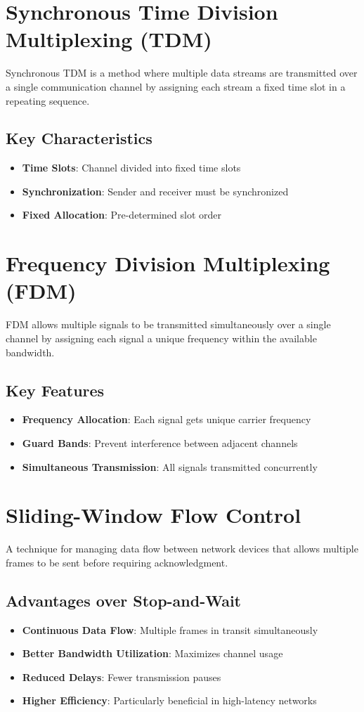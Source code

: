 \documentclass[12pt,a4paper]{article}
\begin{document}
\section{Synchronous Time Division Multiplexing (TDM)}
Synchronous TDM is a method where multiple data streams are transmitted over a single communication channel by assigning each stream a fixed time slot in a repeating sequence.

\subsection{Key Characteristics}
\begin{itemize}
    \item \textbf{Time Slots}: Channel divided into fixed time slots
    \item \textbf{Synchronization}: Sender and receiver must be synchronized
    \item \textbf{Fixed Allocation}: Pre-determined slot order
\end{itemize}

\section{Frequency Division Multiplexing (FDM)}
FDM allows multiple signals to be transmitted simultaneously over a single channel by assigning each signal a unique frequency within the available bandwidth.

\subsection{Key Features}
\begin{itemize}
    \item \textbf{Frequency Allocation}: Each signal gets unique carrier frequency
    \item \textbf{Guard Bands}: Prevent interference between adjacent channels
    \item \textbf{Simultaneous Transmission}: All signals transmitted concurrently
\end{itemize}

\section{Sliding-Window Flow Control}
A technique for managing data flow between network devices that allows multiple frames to be sent before requiring acknowledgment.

\subsection{Advantages over Stop-and-Wait}
\begin{itemize}
    \item \textbf{Continuous Data Flow}: Multiple frames in transit simultaneously
    \item \textbf{Better Bandwidth Utilization}: Maximizes channel usage
    \item \textbf{Reduced Delays}: Fewer transmission pauses
    \item \textbf{Higher Efficiency}: Particularly beneficial in high-latency networks
\end{itemize}
\end{document}
